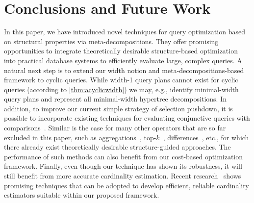 \section{Conclusions and Future Work}
\label{sec:conclusions}

In this paper, we have introduced novel techniques for query optimization based on structural properties via meta-decompositions. They offer promising opportunities to integrate theoretically desirable structure-based optimization into practical database systems to efficiently evaluate large, complex queries.
A natural next step is to extend our width notion and meta-decompositions-based framework to cyclic queries. While width-1 query plans cannot exist for cyclic queries (according to \cref{thm:acyclicwidth}) we may, e.g., identify minimal-width query plans and represent all minimal-width hypertree decompositions.
In addition, to improve our current simple strategy of selection pushdown, it is possible to incorporate existing techniques for evaluating conjunctive queries with comparisons~\cite{SIGMOD22}. Similar is the case for many other operators that are so far excluded in this paper, such as aggregations~\cite{AJAR, FAQ}, top-$k$~\cite{wang2023relational}, differences~\cite{SIGMOD23, PODS24}, etc., for which there already exist theoretically desirable structure-guided approaches. The performance of such methods can also benefit from our cost-based optimization framework.
Finally, even though our technique has shown its robustness, it will still benefit from more accurate cardinality estimation. Recent research~\cite{LPBound, Cai2019CE} shows promising techniques that can be adopted to develop efficient, reliable cardinality estimators suitable within our proposed framework.

